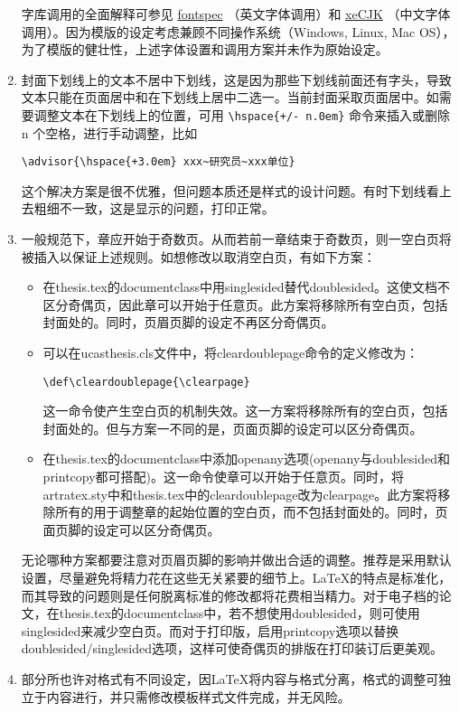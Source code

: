 \begin{enumerate}
                字库调用的全面解释可参见 \href{https://ctan.org/pkg/fontspec}{fontspec} （英文字体调用）和 \href{https://ctan.org/pkg/xecjk?lang=en}{xeCJK} （中文字体调用）。因为模版的设定考虑兼顾不同操作系统（Windows, Linux, Mac OS），为了模版的健壮性，上述字体设置和调用方案并未作为原始设定。
            \item 封面下划线上的文本不居中下划线，这是因为那些下划线前面还有字头，导致文本只能在页面居中和在下划线上居中二选一。当前封面采取页面居中。如需要调整文本在下划线上的位置，可用 \verb|\hspace{+/- n.0em}| 命令来插入或删除 n 个空格，进行手动调整，比如

                \verb|\advisor{\hspace{+3.0em} xxx~研究员~xxx单位}|
                
                这个解决方案是很不优雅，但问题本质还是样式的设计问题。有时下划线看上去粗细不一致，这是显示的问题，打印正常。
    \item  一般规范下，章应开始于奇数页。从而若前一章结束于奇数页，则一空白页将被插入以保证上述规则。如想修改以取消空白页，有如下方案：
     \begin{itemize}
         \item 在thesis.tex的documentclass中用singlesided替代doublesided。这使文档不区分奇偶页，因此章可以开始于任意页。此方案将移除所有空白页，包括封面处的。同时，页眉页脚的设定不再区分奇偶页。
         \item 可以在ucasthesis.cls文件中，将cleardoublepage命令的定义修改为：

             \verb|\def\cleardoublepage{\clearpage}|

             这一命令使产生空白页的机制失效。这一方案将移除所有的空白页，包括封面处的。但与方案一不同的是，页面页脚的设定可以区分奇偶页。
         \item 在thesis.tex的documentclass中添加openany选项(openany与doublesided和printcopy都可搭配)。这一命令使章可以开始于任意页。同时，将artratex.sty中和thesis.tex中的cleardoublepage改为clearpage。此方案将移除所有的用于调整章的起始位置的空白页，而不包括封面处的。同时，页面页脚的设定可以区分奇偶页。
     \end{itemize}
      无论哪种方案都要注意对页眉页脚的影响并做出合适的调整。推荐是采用默认设置，尽量避免将精力花在这些无关紧要的细节上。\LaTeX{}的特点是标准化，而其导致的问题则是任何脱离标准的修改都将花费相当精力。对于电子档的论文，在thesis.tex的documentclass中，若不想使用doublesided，则可使用singlesided来减少空白页。而对于打印版，启用printcopy选项以替换doublesided/singlesided选项，这样可使奇偶页的排版在打印装订后更美观。

  \item 部分所也许对格式有不同设定，因\LaTeX{}将内容与格式分离，格式的调整可独立于内容进行，并只需修改模板样式文件完成，并无风险。
\end{enumerate}


